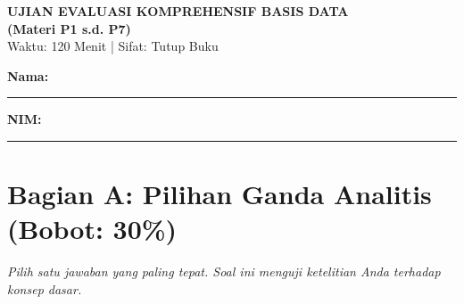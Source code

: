 \documentclass[11pt,a4paper]{article}
\begin{document}
\begin{center}
	\Large\textbf{\sffamily UJIAN EVALUASI KOMPREHENSIF BASIS DATA} \\
	\large\textbf{\sffamily (Materi P1 s.d. P7)} \\
	\vspace{0.5em}
	\normalsize Waktu: 120 Menit | Sifat: Tutup Buku
\end{center}

\vspace{1em}
\noindent\textbf{Nama:} \rule{10cm}{0.4pt} \hfill \textbf{NIM:} \rule{3cm}{0.4pt}

\section*{Bagian A: Pilihan Ganda Analitis (Bobot: 30\%)}
\textit{Pilih satu jawaban yang paling tepat. Soal ini menguji ketelitian Anda terhadap konsep dasar.}
\end{document}
